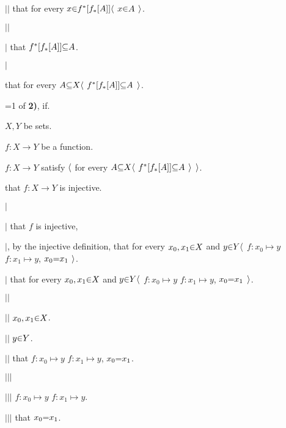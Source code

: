     $|$\hs$|$\hs {} that for every $x \p\in f^*[f_*[\g A]] \a\langle$ $x \p\in \g A$ $\a\rangle$. \par
    $|$\hs$|$\hs \par

  $|$\hs {} that $f^*[f_*[\g A]] \p\subseteq \g A$. \par
  $|$\hs \par

 that for every $\g A \p\subseteq X \a\langle$ $f^*[f_*[\g A]] \p\subseteq \g A$ $\a\rangle$.
\fi

=1
\vs
{} of {\bf 2)}, if. \par
{} $X,Y$ be sets. \par
{} $f: X \to Y$ be a function. \par
{} $f: X \to Y$ satisfy $\a\langle$ for every $\g A \p\subseteq X \a\langle$ $f^*[f_*[\g A]] \p\subseteq \g A$ $\a\rangle$ $\a\rangle$. \par
{} that $f: X \to Y$ is injective. \par

  $|$\hs \par
  $|$\hs {}  that $f$ is injective, \par
  $|$\hs {}, by the injective definition,  that for every $x_0,x_1 \p\in X$ and $y \p\in Y \a\langle$  $f: x_0 \mapsto y$  $f: x_1 \mapsto y$,  $x_0 \p= x_1$ $\a\rangle$. \par
  $|$\hs {} that for every $x_0,x_1 \p\in X$ and $y \p\in Y \a\langle$  $f: x_0 \mapsto y$  $f: x_1 \mapsto y$,  $x_0 \p= x_1$ $\a\rangle$. \par

    $|$\hs$|$\hs \par
    $|$\hs$|$\hs {} $x_0,x_1 \p\in X$. \par
    $|$\hs$|$\hs {} $y \p\in Y$. \par
    $|$\hs$|$\hs {} that  $f: x_0 \mapsto y$  $f: x_1 \mapsto y$,  $x_0 \p= x_1$. \par

      $|$\hs$|$\hs$|$\hs \par
      $|$\hs$|$\hs$|$\hs {} $f: x_0 \mapsto y$  $f: x_1 \mapsto y$. \par
      $|$\hs$|$\hs$|$\hs {} that $x_0 \p= x_1$. \par
        
